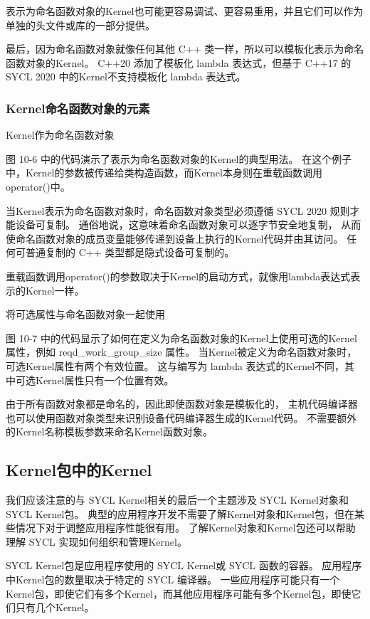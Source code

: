 表示为命名函数对象的Kernel也可能更容易调试、更容易重用，并且它们可以作为单独的头文件或库的一部分提供。

最后，因为命名函数对象就像任何其他 C++ 类一样，所以可以模板化表示为命名函数对象的Kernel。 
C++20 添加了模板化 lambda 表达式，但基于 C++17 的 SYCL 2020 中的Kernel不支持模板化 lambda 表达式。

\subsubsection{Kernel命名函数对象的元素}
{\color{red} Kernel作为命名函数对象}

图 10-6 中的代码演示了表示为命名函数对象的Kernel的典型用法。 
在这个例子中，Kernel的参数被传递给类构造函数，而Kernel本身则在重载函数调用operator()中。

当Kernel表示为命名函数对象时，命名函数对象类型必须遵循 SYCL 2020 规则才能设备可复制。 
通俗地说，这意味着命名函数对象可以逐字节安全地复制，
从而使命名函数对象的成员变量能够传递到设备上执行的Kernel代码并由其访问。 
任何可普通复制的 C++ 类型都是隐式设备可复制的。

重载函数调用operator()的参数取决于Kernel的启动方式，就像用lambda表达式表示的Kernel一样。

{\color{red} 将可选属性与命名函数对象一起使用}

图 10-7 中的代码显示了如何在定义为命名函数对象的Kernel上使用可选的Kernel属性，例如 reqd\_work\_group\_size 属性。 
当Kernel被定义为命名函数对象时，可选Kernel属性有两个有效位置。 
这与编写为 lambda 表达式的Kernel不同，其中可选Kernel属性只有一个位置有效。

由于所有函数对象都是命名的，因此即使函数对象是模板化的，
主机代码编译器也可以使用函数对象类型来识别设备代码编译器生成的Kernel代码。 
不需要额外的Kernel名称模板参数来命名Kernel函数对象。

\subsection{Kernel包中的Kernel}
我们应该注意的与 SYCL Kernel相关的最后一个主题涉及 SYCL Kernel对象和 SYCL Kernel包。 
典型的应用程序开发不需要了解Kernel对象和Kernel包，但在某些情况下对于调整应用程序性能很有用。 
了解Kernel对象和Kernel包还可以帮助理解 SYCL 实现如何组织和管理Kernel。

SYCL Kernel包是应用程序使用的 SYCL Kernel或 SYCL 函数的容器。 
应用程序中Kernel包的数量取决于特定的 SYCL 编译器。 
一些应用程序可能只有一个Kernel包，即使它们有多个Kernel，而其他应用程序可能有多个Kernel包，即使它们只有几个Kernel。

